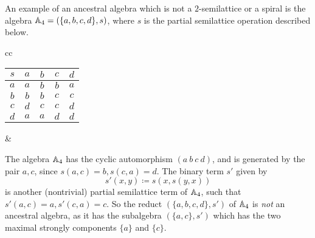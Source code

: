 \documentclass[letterpaper,11pt]{article}
\begin{document}
\begin{ex}\label{ex-ancestral-strong} An example of an ancestral algebra which is not a $2$-semilattice or a spiral is the algebra $\mathbb{A}_4 = (\{a,b,c,d\},s)$, where $s$ is the partial semilattice operation described below.
\begin{center}
\begin{tabular}{cc}%
\begin{tabular}{c|cccc} $s$ & $a$ & $b$ & $c$ & $d$\\ \hline $a$ & $a$ & $b$ & $b$ & $a$\\ $b$ & $b$ & $b$ & $c$ & $c$\\ $c$ & $d$ & $c$ & $c$ & $d$\\ $d$ & $a$ & $a$ & $d$ & $d$\end{tabular} & 
\end{tabular}
\end{center}
The algebra $\mathbb{A}_4$ has the cyclic automorphism $(a\ b\ c\ d)$, and is generated by the pair $a,c$, since $s(a,c) = b, s(c,a) = d$. The binary term $s'$ given by
\[
s'(x,y) \coloneqq s(x,s(y,x))
\]
is another (nontrivial) partial semilattice term of $\mathbb{A}_4$, such that $s'(a,c) = a, s'(c,a) = c$. So the reduct $(\{a,b,c,d\},s')$ of $\mathbb{A}_4$ is \emph{not} an ancestral algebra, as it has the subalgebra $(\{a,c\},s')$ which has the two maximal strongly components $\{a\}$ and $\{c\}$.


\end{ex}
\end{document}
